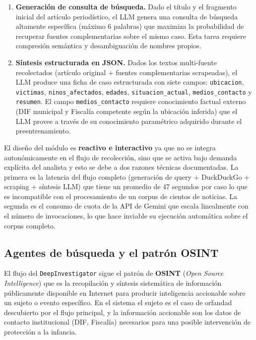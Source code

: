 \begin{enumerate}
    \item \textbf{Generación de consulta de búsqueda.} Dado el título y el fragmento
          inicial del artículo periodístico, el LLM genera una consulta de búsqueda
          altamente específica (máximo 6 palabras) que maximiza la probabilidad de
          recuperar fuentes complementarias sobre el mismo caso. Esta tarea
          requiere compresión semántica y desambiguación de nombres propios.

    \item \textbf{Síntesis estructurada en JSON.} Dados los textos multi-fuente
          recolectados (artículo original + fuentes complementarias scrapeadas),
          el LLM produce una ficha de caso estructurada con siete campos:
          \texttt{ubicacion}, \texttt{victimas}, \texttt{ninos\_afectados},
          \texttt{edades}, \texttt{situacion\_actual}, \texttt{medios\_contacto}
          y \texttt{resumen}. El campo \texttt{medios\_contacto} requiere
          conocimiento factual externo (DIF municipal y Fiscalía competente
          según la ubicación inferida) que el LLM provee a través de su
          conocimiento paramétrico adquirido durante el preentrenamiento.
\end{enumerate}

El diseño del módulo es \textbf{reactivo e interactivo} ya que no se integra
autonómicamente en el flujo de recolección, sino que se activa bajo demanda
explícita del analista y esto se debe a dos razones técnicas documentadas. La primera es la
latencia del flujo completo (generación de query + DuckDuckGo + scraping
+ síntesis LLM) que tiene un promedio de 47 segundos por caso lo que es incompatible con
el procesamiento de un corpus de cientos de noticias. La segunda es el consumo de
cuota de la API de Gemini que escala linealmente con el número de invocaciones,
lo que hace inviable su ejecución automática sobre el corpus completo.

\subsection{Agentes de búsqueda y el patrón OSINT}
\label{subsec:mt_osint}

El flujo del \texttt{DeepInvestigator} sigue el patrón de \textbf{OSINT}
(\textit{Open Source Intelligence}) que es la recopilación y síntesis sistemática
de información públicamente disponible en Internet para producir inteligencia
accionable sobre un sujeto o evento específico. En el sistema el sujeto
es el caso de orfandad descubierto por el flujo principal, y la
información accionable son los datos de contacto institucional (DIF, Fiscalía)
necesarios para una posible intervención de protección a la infancia.

